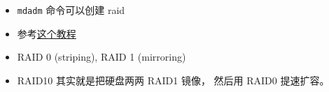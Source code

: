 
\begin{issues}
\issueDraft
\end{issues}

\begin{itemize}
\item \verb|mdadm| 命令可以创建 raid
\item 参考\href{https://www.digitalocean.com/community/tutorials/how-to-create-raid-arrays-with-mdadm-on-ubuntu-22-04}{这个教程}
\item RAID 0 (striping), RAID 1 (mirroring)
\item RAID10 其实就是把硬盘两两 RAID1 镜像， 然后用 RAID0 提速扩容。
\end{itemize}

